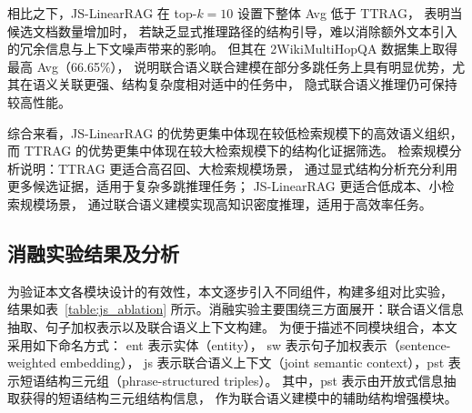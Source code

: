 相比之下，JS-LinearRAG 在 top-$k=10$ 设置下整体 Avg 低于 TTRAG，
表明当候选文档数量增加时，
若缺乏显式推理路径的结构引导，难以消除额外文本引入的冗余信息与上下文噪声带来的影响。
但其在 2WikiMultiHopQA 数据集上取得最高 Avg（66.65\%），
说明联合语义联合建模在部分多跳任务上具有明显优势，尤其在语义关联更强、结构复杂度相对适中的任务中，
隐式联合语义推理仍可保持较高性能。

综合来看，JS-LinearRAG 的优势更集中体现在较低检索规模下的高效语义组织，
而 TTRAG 的优势更集中体现在较大检索规模下的结构化证据筛选。
检索规模分析说明：TTRAG 更适合高召回、大检索规模场景，
通过显式结构分析充分利用更多候选证据，适用于复杂多跳推理任务；
JS-LinearRAG 更适合低成本、小检索规模场景，
通过联合语义建模实现高知识密度推理，适用于高效率任务。

\subsection{消融实验结果及分析}

为验证本文各模块设计的有效性，本文逐步引入不同组件，构建多组对比实验，
结果如表~\ref{table:js_ablation} 所示。消融实验主要围绕三方面展开：联合语义信息抽取、句子加权表示以及联合语义上下文构建。
为便于描述不同模块组合，本文采用如下命名方式：
ent 表示实体（entity），
sw 表示句子加权表示（sentence-weighted embedding），
js 表示联合语义上下文（joint semantic context），pst 表示短语结构三元组（phrase-structured triples）。
其中，pst 表示由开放式信息抽取获得的短语结构三元组结构信息，
作为联合语义建模中的辅助结构增强模块。

